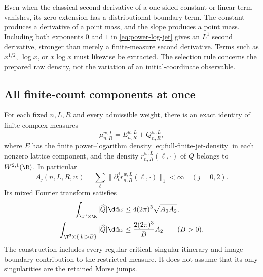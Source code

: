 \begin{remark}
\label{rem:constant-slope-extraction}
Even when the classical second derivative of a one-sided constant or
linear term vanishes, its zero extension has a distributional boundary
term. The constant produces a derivative of a point mass, and the slope
produces a point mass. Including both exponents $0$ and $1$ in
\eqref{eq:power-log-jet} gives an $L^1$ second derivative, stronger than
merely a finite-measure second derivative. Terms such as
$x^{1/2}$, $\log x$, or $x\log x$ must likewise be extracted. The
selection rule concerns the prepared raw density, not the variation of
an initial-coordinate observable.
\end{remark}

\subsection{All finite-count components at once}
\begin{theorem}
\label{thm:finite-count-raw-extraction}
For each fixed $n,L,R$ and every admissible weight, there is an exact
identity of finite complex measures
\begin{equation}\label{eq:finite-count-exact-extraction}
 \mu_{n,R}^{w,L}=E_{n,R}^{w,L}+Q_{n,R}^{w,L},
\end{equation}
where $E$ has the finite power--logarithm density
\eqref{eq:full-finite-jet-density} in each nonzero lattice component,
and the density $r_{n,R}^{w,L}(\ell,\cdot)$ of $Q$ belongs to
$W^{2,1}(\R)$. In particular
\begin{equation}\label{eq:finite-count-residual-norms}
 A_j(n,L,R,w)=\sum_\ell\|\partial_t^j
                              r_{n,R}^{w,L}(\ell,\cdot)\|_1<\infty
 \quad(j=0,2).
\end{equation}
Its mixed Fourier transform satisfies
\begin{align}
 \int_{\T^3\times\R}|\widehat Q|\dd\omega
 &\le4(2\pi)^3\sqrt{A_0A_2},
       \label{eq:finite-count-Fourier-integrable}\\
 \int_{\T^3\times\{|b|>B\}}|\widehat Q|\dd\omega
 &\le\frac{2(2\pi)^3}{B}A_2\qquad(B>0).
       \label{eq:finite-count-far-tail}
\end{align}
The construction includes every regular critical, singular itinerary
and image-boundary contribution to the restricted measure. It does
not assume that its only singularities are the retained Morse jumps.
\end{theorem}
